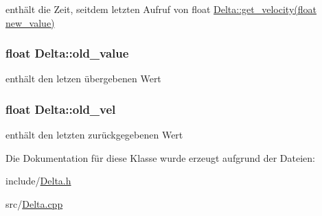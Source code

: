 enthält die Zeit, seitdem letzten Aufruf von float \hyperlink{class_delta_a16d1cf25743928796d7cf1e5c7882c17}{Delta::get\_\-velocity(float new\_\-value)} 

\hypertarget{class_delta_a1724264763801016d7d1c0d5f4817a96}{
\subsubsection[{old\_\-value}]{\setlength{\rightskip}{0pt plus 5cm}float {\bf Delta::old\_\-value}}}
\label{class_delta_a1724264763801016d7d1c0d5f4817a96}


enthält den letzen übergebenen Wert 

\hypertarget{class_delta_a479029e6db0f2738547961f0d72bec78}{
\subsubsection[{old\_\-vel}]{\setlength{\rightskip}{0pt plus 5cm}float {\bf Delta::old\_\-vel}}}
\label{class_delta_a479029e6db0f2738547961f0d72bec78}


enthält den letzten zurückgegebenen Wert 



Die Dokumentation für diese Klasse wurde erzeugt aufgrund der Dateien:\begin{DoxyCompactItemize}
\item 
include/\hyperlink{_delta_8h}{Delta.h}\item 
src/\hyperlink{_delta_8cpp}{Delta.cpp}\end{DoxyCompactItemize}
